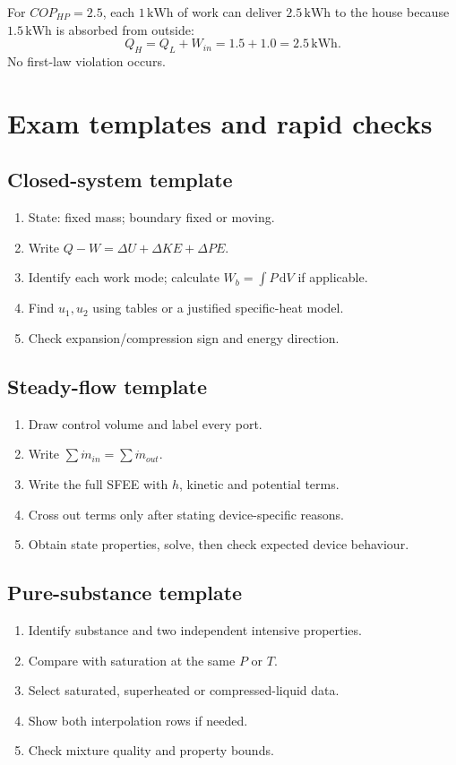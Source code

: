 \documentclass[10pt,a4paper]{article}
\newcommand{\dd}{\,\mathrm{d}}\newcommand{\unit}[1]{\,\mathrm{#1}}
\begin{document}
\begin{example}
For $COP_{HP}=2.5$, each $1\unit{kWh}$ of work can deliver $2.5\unit{kWh}$ to the house because $1.5\unit{kWh}$ is absorbed from outside:
\[
Q_H=Q_L+W_{in}=1.5+1.0=2.5\unit{kWh}.
\]
No first-law violation occurs.
\end{example}

\section{Exam templates and rapid checks}
\subsection{Closed-system template}
\begin{enumerate}
\item State: fixed mass; boundary fixed or moving.
\item Write $Q-W=\Delta U+\Delta KE+\Delta PE$.
\item Identify each work mode; calculate $W_b=\int P\dd V$ if applicable.
\item Find $u_1,u_2$ using tables or a justified specific-heat model.
\item Check expansion/compression sign and energy direction.
\end{enumerate}

\subsection{Steady-flow template}
\begin{enumerate}
\item Draw control volume and label every port.
\item Write $\sum\dot m_{in}=\sum\dot m_{out}$.
\item Write the full SFEE with $h$, kinetic and potential terms.
\item Cross out terms only after stating device-specific reasons.
\item Obtain state properties, solve, then check expected device behaviour.
\end{enumerate}

\subsection{Pure-substance template}
\begin{enumerate}
\item Identify substance and two independent intensive properties.
\item Compare with saturation at the same $P$ or $T$.
\item Select saturated, superheated or compressed-liquid data.
\item Show both interpolation rows if needed.
\item Check mixture quality and property bounds.
\end{enumerate}
\end{document}
